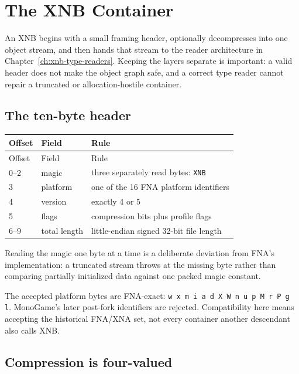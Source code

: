 \chapter{The XNB Container}
\label{ch:xnb-container}

An XNB begins with a small framing header, optionally decompresses into one object stream, and
then hands that stream to the reader architecture in Chapter~\ref{ch:xnb-type-readers}.  Keeping
the layers separate is important: a valid header does not make the object graph safe, and a
correct type reader cannot repair a truncated or allocation-hostile container.



\section{The ten-byte header}
\label{sec:xnb-container-boundary}

\begin{longtable}{p{}p{}p{}}
\toprule
Offset & Field & Rule \\
\midrule
\endfirsthead
\toprule
Offset & Field & Rule \\
\midrule
\endhead
0--2 & magic & three separately read bytes: \texttt{XNB} \\
3 & platform & one of the 16 FNA platform identifiers \\
4 & version & exactly 4 or 5 \\
5 & flags & compression bits plus profile flags \\
6--9 & total length & little-endian signed 32-bit file length \\
\bottomrule
\end{longtable}

Reading the magic one byte at a time is a deliberate deviation from FNA's implementation: a
truncated stream throws  at the missing byte rather than comparing
partially initialized data against one packed magic constant.

The accepted platform bytes are FNA-exact:
\texttt{w x m i a d X W n u p M r P g l}.  MonoGame's later post-fork identifiers are rejected.
Compatibility here means accepting the historical FNA/XNA set, not every container another
descendant also calls XNB.

\section{Compression is four-valued}


